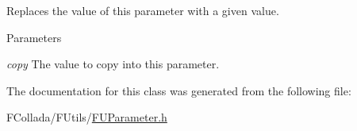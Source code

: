 \label{classFUParameterT_a56ef63916af42d47fc4ecab3a7b93ec3}
Replaces the value of this parameter with a given value. 
\begin{DoxyParams}{Parameters}
\item[{\em copy}]The value to copy into this parameter. \end{DoxyParams}


The documentation for this class was generated from the following file:\begin{DoxyCompactItemize}
\item 
FCollada/FUtils/\hyperlink{FUParameter_8h}{FUParameter.h}\end{DoxyCompactItemize}
